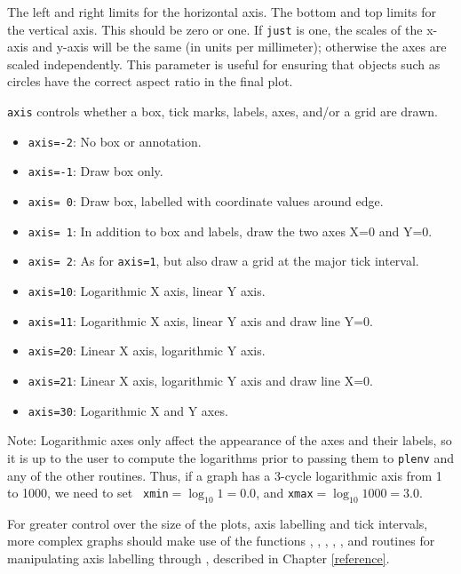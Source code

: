 {The left and right limits for the horizontal axis.}
{The bottom and top limits for the vertical axis.}
{This should be zero or one. If {\tt just} is one, the scales of the
x-axis and
y-axis will be the same (in units per millimeter); otherwise the axes are
scaled independently. This parameter is useful for ensuring that objects
such as circles have the correct aspect ratio in the final plot.}
{{\tt axis} controls whether a box, tick marks, labels, axes, and/or a
grid are drawn.
\begin{itemize}
     \item {\tt axis=-2}: No box or annotation.
     \item {\tt axis=-1}: Draw box only.
     \item {\tt axis= 0}: Draw box, labelled with coordinate values around edge.
     \item {\tt axis= 1}: In addition to box and labels, draw the two axes
                          X=0 and Y=0.
     \item {\tt axis= 2}: As for {\tt axis=1}, but also draw a grid at the major tick interval.
     \item {\tt axis=10}: Logarithmic X axis, linear Y axis.
     \item {\tt axis=11}: Logarithmic X axis, linear Y axis and draw line Y=0.
     \item {\tt axis=20}: Linear X axis, logarithmic Y axis.
     \item {\tt axis=21}: Linear X axis, logarithmic Y axis and draw line X=0.
     \item {\tt axis=30}: Logarithmic X and Y axes.
\end{itemize}
}

Note: Logarithmic axes only affect the appearance of the axes and their
labels, so it is up to the user to compute the logarithms prior to passing
them to {\tt plenv} and any of the other routines. Thus, if a graph has a
3-cycle logarithmic axis from 1 to 1000, we need to set {\tt
xmin}$=\log_{10}1=0.0$, and {\tt xmax}$=\log_{10}1000=3.0$. 

For greater control over the size of the plots, axis labelling and tick
intervals, more complex graphs should make use of the functions
, , , , , and
routines for manipulating axis labelling  through ,
described in Chapter \ref{reference}. 

